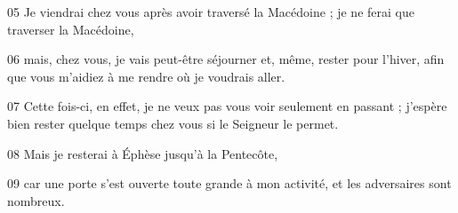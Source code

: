 
05 Je viendrai chez vous après avoir traversé la Macédoine ; je ne ferai que traverser la Macédoine,

06 mais, chez vous, je vais peut-être séjourner et, même, rester pour l’hiver, afin que vous m’aidiez à me rendre où je voudrais aller.

07 Cette fois-ci, en effet, je ne veux pas vous voir seulement en passant ; j’espère bien rester quelque temps chez vous si le Seigneur le permet.

08 Mais je resterai à Éphèse jusqu’à la Pentecôte,

09 car une porte s’est ouverte toute grande à mon activité, et les adversaires sont nombreux.
